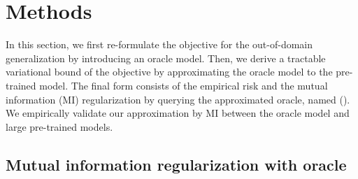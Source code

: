 \section{Methods}

In this section, we first re-formulate the objective for the out-of-domain generalization by introducing an oracle model. Then, we derive a tractable variational bound of the objective by approximating the oracle model to the pre-trained model. The final form consists of the empirical risk and the mutual information (MI) regularization by querying the approximated oracle, named \fullname{} (\method{}). We empirically validate our approximation by MI between the oracle model and large pre-trained models. 

\subsection{Mutual information regularization with oracle}

